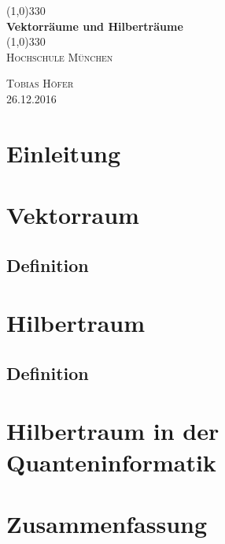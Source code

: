 \documentclass{article}
\begin{document}
\begin{titlepage}
	\begin{center}
	\line(1,0){330} \\
	\vspace{.75 cm}
	\huge{\bfseries Vektorräume und Hilberträume}\\
	\vspace{.25 cm}
	\line(1,0){330} \\
	\vspace{1.5 cm}
	\textsc{\LARGE Hochschule M\"unchen}\\
	\vspace{10 cm}
	\end{center}
	\begin{flushright}
	\textsc{\large Tobias H\"ofer\\26.12.2016}
	\end{flushright}
\end{titlepage}

\tableofcontents
\thispagestyle{empty}
\cleardoublepage

\setcounter{page}{1}
\section{Einleitung}\label{sec:intro}
\lipsum[1]
\section{Vektorraum}\label{sec:vec}
\subsection{Definition}\label{sec:vecdef} \cite{ref:one}
\section{Hilbertraum}\label{sec:hil}
\subsection{Definition}\label{sec:hildef}
\section{Hilbertraum in der Quanteninformatik}\label{sec:def}
\section{Zusammenfassung}\label{sec:intro}

\cleardoublepage


\end{document}

